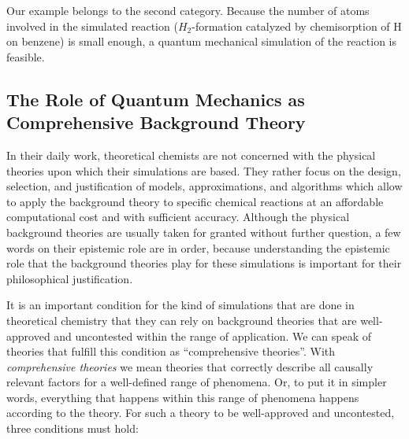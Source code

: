 \documentclass[12pt, a4paper]{article}
\newcommand{\jka}[1]{\blue\textsf{JK comment: #1 }\black}
\numberwithin{equation}{section}
\begin{document}

Our example belongs to the second category. Because the number of atoms
involved in the simulated reaction ($H_2$-formation catalyzed by 
chemisorption of H on benzene) is small enough, a quantum mechanical
simulation of the reaction is feasible. 

\subsection{The Role of Quantum Mechanics as Comprehensive Background
  Theory}

In their daily work, theoretical chemists are not concerned with the
physical theories upon which their simulations are based. They rather
focus on the design, selection, and justification of models,
approximations, and algorithms which allow to apply the background
theory to specific chemical reactions at an affordable computational
cost and with sufficient accuracy. Although the physical background
theories are usually taken for granted without further question, a few
words on their epistemic role are in order, because understanding the
epistemic role that the background theories play for these simulations
is important for their philosophical justification.

It is an important condition for the kind of simulations that are done
in theoretical chemistry that they can rely on background theories
that are well-approved and uncontested within the range of
application.  We can speak of theories that fulfill this condition as
``comprehensive theories''.  With {\em comprehensive theories} we mean
theories that correctly describe all causally relevant factors for a
well-defined range of phenomena. Or, to put it in simpler words,
everything that happens within this range of phenomena happens
according to the theory. For such a theory to be well-approved and
uncontested, three conditions must hold:
\end{document}
